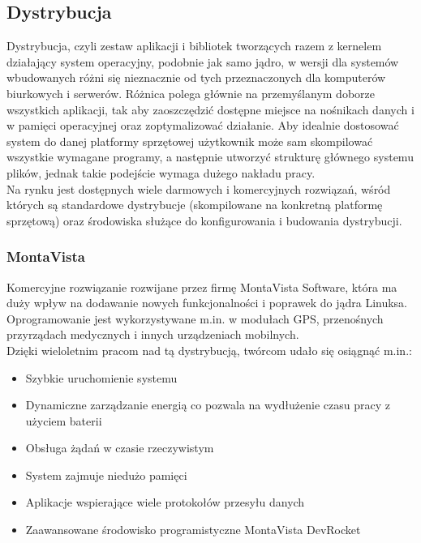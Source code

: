 \documentclass[a4paper,12pt]{book}
\begin{document}
			\subsection{Dystrybucja}
				Dystrybucja, czyli zestaw aplikacji i bibliotek tworzących razem z kernelem działający system operacyjny, podobnie jak samo jądro, w wersji dla systemów wbudowanych różni się nieznacznie od tych przeznaczonych dla komputerów biurkowych i serwerów. Różnica polega głównie na przemyślanym doborze wszystkich aplikacji, tak aby zaoszczędzić dostępne miejsce na nośnikach danych i w pamięci operacyjnej oraz zoptymalizować działanie. Aby idealnie dostosować system do danej platformy sprzętowej użytkownik może sam skompilować wszystkie wymagane programy, a następnie utworzyć strukturę głównego systemu plików, jednak takie podejście wymaga dużego nakładu pracy.\\
				Na rynku jest dostępnych wiele darmowych i komercyjnych rozwiązań, wśród których są standardowe dystrybucje (skompilowane na konkretną platformę sprzętową) oraz środowiska służące do konfigurowania i budowania dystrybucji.
				\subsubsection{MontaVista}
					Komercyjne rozwiązanie rozwijane przez firmę MontaVista Software, która ma duży wpływ na dodawanie nowych funkcjonalności i poprawek do jądra Linuksa. Oprogramowanie jest wykorzystywane m.in. w modułach GPS, przenośnych przyrządach medycznych i innych urządzeniach mobilnych.\\
					Dzięki wieloletnim pracom nad tą dystrybucją, twórcom udało się osiągnąć m.in.:
					\begin{itemize}
						\item Szybkie uruchomienie systemu
						\item Dynamiczne zarządzanie energią co pozwala na wydłużenie czasu pracy z użyciem baterii
						\item Obsługa żądań w czasie rzeczywistym
						\item System zajmuje niedużo pamięci
						\item Aplikacje wspierające wiele protokołów przesyłu danych
						\item Zaawansowane środowisko programistyczne MontaVista DevRocket
					\end{itemize}
\end{document}
